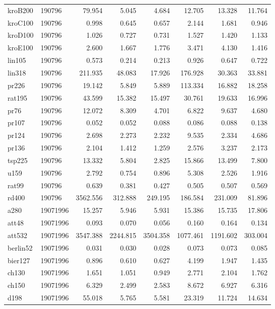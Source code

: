 \begin{center}
\begin{longtable}{llrrrrrr}
kroB200  & 190796 & 79.954 & 5.045 & 4.684 & 12.705 & 13.328 & 11.764\\
kroC100  & 190796 & 0.998 & 0.645 & 0.657 & 2.144 & 1.681 & 0.946\\
kroD100  & 190796 & 1.026 & 0.727 & 0.731 & 1.527 & 1.420 & 1.133\\
kroE100  & 190796 & 2.600 & 1.667 & 1.776 & 3.471 & 4.130 & 1.416\\
lin105  & 190796 & 0.573 & 0.214 & 0.213 & 0.926 & 0.647 & 0.722\\
lin318  & 190796 & 211.935 & 48.083 & 17.926 & 176.928 & 30.363 & 33.881\\
pr226  & 190796 & 19.142 & 5.849 & 5.889 & 113.334 & 16.882 & 18.258\\
rat195  & 190796 & 43.599 & 15.382 & 15.497 & 30.761 & 19.633 & 16.996\\
pr76  & 190796 & 12.072 & 8.309 & 4.701 & 6.822 & 9.637 & 4.680\\
pr107  & 190796 & 0.052 & 0.052 & 0.088 & 0.086 & 0.088 & 0.138\\
pr124  & 190796 & 2.698 & 2.273 & 2.232 & 9.535 & 2.334 & 4.686\\
pr136  & 190796 & 2.104 & 1.412 & 1.259 & 2.576 & 3.237 & 2.173\\
tsp225  & 190796 & 13.332 & 5.804 & 2.825 & 15.866 & 13.499 & 7.800\\
u159  & 190796 & 2.792 & 0.754 & 0.896 & 5.308 & 2.526 & 1.916\\
rat99  & 190796 & 0.639 & 0.381 & 0.427 & 0.505 & 0.507 & 0.569\\
rd400  & 190796 & 3562.556 & 312.888 & 249.195 & 186.584 & 231.009 & 81.896\\
a280  & 19071996 & 15.257 & 5.946 & 5.931 & 15.386 & 15.735 & 17.806\\
att48  & 19071996 & 0.093 & 0.070 & 0.056 & 0.160 & 0.164 & 0.134\\
att532  & 19071996 & 3547.388 & 2244.815 & 3504.358 & 1077.461 & 1191.602 & 303.004\\
berlin52  & 19071996 & 0.031 & 0.030 & 0.028 & 0.073 & 0.073 & 0.085\\
bier127  & 19071996 & 0.896 & 0.610 & 0.627 & 4.199 & 1.947 & 1.435\\
ch130  & 19071996 & 1.651 & 1.051 & 0.949 & 2.771 & 2.104 & 1.762\\
ch150  & 19071996 & 6.329 & 2.499 & 2.583 & 8.672 & 6.927 & 6.316\\
d198  & 19071996 & 55.018 & 5.765 & 5.581 & 23.319 & 11.724 & 14.634\\

\end{longtable}
\end{center}
